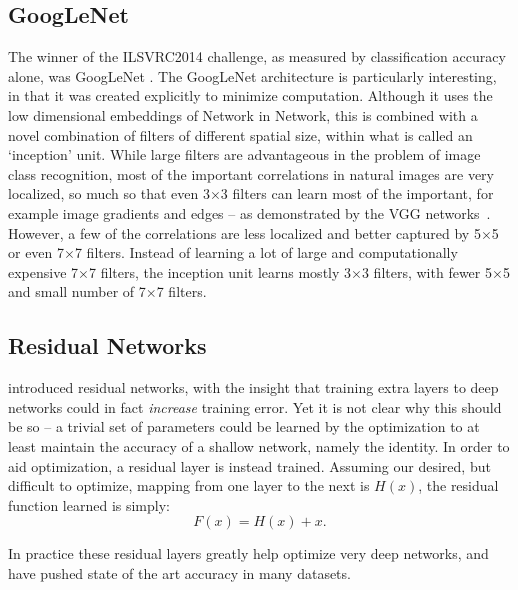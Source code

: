 \documentclass[thesis]{subfiles}
\begin{document}
\subsection{GoogLeNet}
The winner of the ILSVRC2014 challenge, as measured by classification accuracy alone, was GoogLeNet \citep{Szegedy2014going}. The GoogLeNet architecture is particularly interesting, in that it was created explicitly to minimize computation. Although it uses the low dimensional embeddings of Network in Network, this is combined with a novel combination of filters of different spatial size, within what is called an `inception' unit. While large filters are advantageous in the problem of image class recognition, most of the important correlations in natural images are very localized, so much so that even 3$\times$3 filters can learn most of the important, for example image gradients and edges -- as demonstrated by the VGG networks~\citep{Simonyan2014verydeep}. However, a few of the correlations are less localized and better captured by 5$\times$5 or even 7$\times$7 filters. Instead of learning a lot of large and computationally expensive 7$\times$7 filters, the inception unit learns mostly 3$\times$3 filters, with fewer 5$\times$5 and small number of 7$\times$7 filters. 


\subsection{Residual Networks}
\citet{He2015} introduced residual networks, with the insight that training extra layers to deep networks could in fact \emph{increase} training error. Yet it is not clear why this should be so -- a trivial set of parameters could be learned by the optimization to at least maintain the accuracy of a shallow network, namely the identity. In order to aid optimization, a residual layer is instead trained. Assuming our desired, but difficult to optimize, mapping from one layer to the next is $H(x)$, the residual function learned is simply:
\begin{equation}
	F(x) = H(x) + x.
\end{equation}

In practice these residual layers greatly help optimize very deep networks, and have pushed state of the art accuracy in many datasets.
\end{document}
